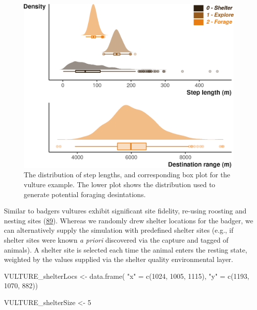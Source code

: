 \documentclass[10pt,a4paper]{article}
\newenvironment{Shaded}{}{}
\newcommand{\DecValTok}[1]{#1}
\newcommand{\FunctionTok}[1]{#1}
\newcommand{\NormalTok}[1]{#1}
\newcommand{\OtherTok}[1]{#1}
\newcommand{\StringTok}[1]{#1}
\begin{document}
\begin{figure}

{\centering \includegraphics{Agent-based_model_walkthrough_files/figure-latex/VULTUREsettingMoveDesPlot-1} 

}

\caption{The distribution of step lengths, and corresponding box plot for the vulture example. The lower plot shows the distribution used to generate potential foraging desintations.}\label{fig:VULTUREsettingMoveDesPlot}
\end{figure}

Similar to badgers vultures exhibit significant site fidelity, re-using roosting and nesting sites (\protect\hyperlink{ref-bracis_revisitation_2018}{89}).
Whereas we randomly drew shelter locations for the badger, we can alternatively supply the simulation with predefined shelter sites (e.g., if shelter sites were known \emph{a priori} discovered via the capture and tagged of animals).
A shelter site is selected each time the animal enters the resting state, weighted by the values supplied via the shelter quality environmental layer.

\begin{Shaded}
\begin{Highlighting}[]
\NormalTok{VULTURE\_shelterLocs }\OtherTok{\textless{}{-}} \FunctionTok{data.frame}\NormalTok{(}
  \StringTok{"x"} \OtherTok{=} \FunctionTok{c}\NormalTok{(}\DecValTok{1024}\NormalTok{, }\DecValTok{1005}\NormalTok{, }\DecValTok{1115}\NormalTok{),}
  \StringTok{"y"} \OtherTok{=} \FunctionTok{c}\NormalTok{(}\DecValTok{1193}\NormalTok{, }\DecValTok{1070}\NormalTok{, }\DecValTok{882}\NormalTok{))}

\NormalTok{VULTURE\_shelterSize }\OtherTok{\textless{}{-}} \DecValTok{5}
\end{Highlighting}
\end{Shaded}
\end{document}
